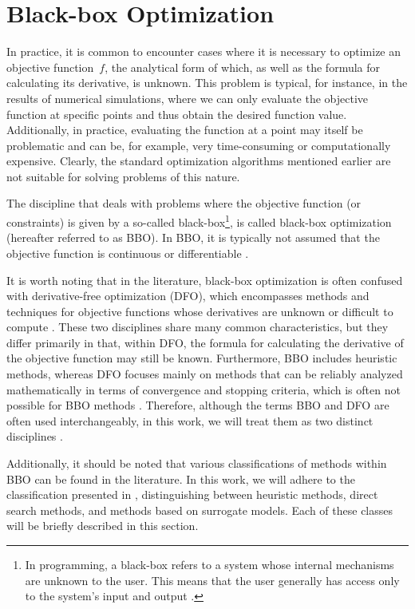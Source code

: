 \section{Black-box Optimization}\label{black-box}
In practice, it is common to encounter cases where it is necessary to optimize an objective function~$f$, the analytical form of which, as well as the formula for calculating its derivative, is unknown. This problem is typical, for instance, in the results of numerical simulations, where we can only evaluate the objective function at specific points and thus obtain the desired function value. Additionally, in practice, evaluating the function at a point may itself be problematic and can be, for example, very time-consuming or computationally expensive. Clearly, the standard optimization algorithms mentioned earlier are not suitable for solving problems of this nature.

The discipline that deals with problems where the objective function (or constraints) is given by a so-called black-box\footnote{In programming, a black-box refers to a system whose internal mechanisms are unknown to the user. This means that the user generally has access only to the system’s input and output \cite{BBO-textbook}.}, is called black-box optimization (hereafter referred to as BBO). In BBO, it is typically not assumed that the objective function is continuous or differentiable \cite{BBO-textbook, derivative-free-review, two-decades}.

It is worth noting that in the literature, black-box optimization is often confused with derivative-free optimization (DFO), which encompasses methods and techniques for objective functions whose derivatives are unknown or difficult to compute \cite{BBO-textbook, derivative-free-review, Kramer2011}. These two disciplines share many common characteristics, but they differ primarily in that, within DFO, the formula for calculating the derivative of the objective function may still be known. Furthermore, BBO includes heuristic methods, whereas DFO focuses mainly on methods that can be reliably analyzed mathematically in terms of convergence and stopping criteria, which is often not possible for BBO methods \cite{BBO-textbook}. Therefore, although the terms BBO and DFO are often used interchangeably, in this work, we will treat them as two distinct disciplines \cite{BBO-textbook}.

Additionally, it should be noted that various classifications of methods within BBO can be found in the literature. In this work, we will adhere to the classification presented in \cite{BBO-textbook}, distinguishing between heuristic methods, direct search methods, and methods based on surrogate models. Each of these classes will be briefly described in this section.



%
%